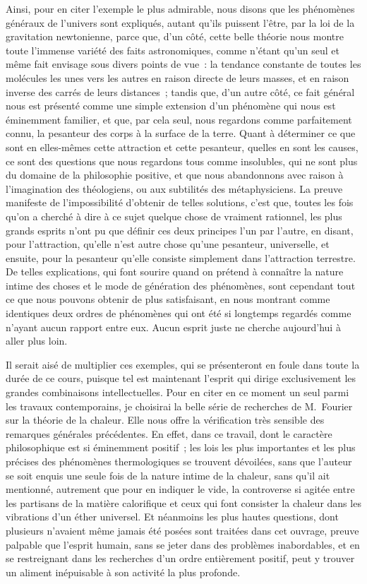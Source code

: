 \documentclass[french,twoside]{book} %
\begin{document}
Ainsi, pour en citer l’exemple le plus admirable, nous disons que les phénomènes généraux de l’univers sont expliqués, autant qu’ils puissent l’être, par la loi de la gravitation newtonienne, parce que, d’un côté, cette belle théorie nous montre toute l’immense variété des faits astronomiques, comme n’étant qu’un seul et même fait envisage sous divers points de vue : la tendance constante de toutes les molécules les unes vers les autres en raison directe de leurs masses, et en raison inverse des carrés de leurs distances ; tandis que, d’un autre côté, ce fait général nous est présenté comme une simple extension d’un phénomène qui nous est éminemment familier, et que, par cela seul, nous regardons comme parfaitement connu, la pesanteur des corps à la surface de la terre. Quant à déterminer ce que sont en elles-mêmes cette attraction et cette pesanteur, quelles en sont les causes, ce sont des questions que nous regardons tous comme insolubles, qui ne sont plus du domaine de la philosophie positive, et que nous abandonnons avec raison à l’imagination des théologiens, ou aux subtilités des métaphysiciens. La preuve manifeste de l’impossibilité d’obtenir de telles solutions, c’est que, toutes les fois qu’on a cherché à dire à ce sujet quelque chose de vraiment rationnel, les plus grands esprits n’ont pu que définir ces deux principes l’un par l’autre, en disant, pour l’attraction, qu’elle n’est autre chose qu’une pesanteur, universelle, et ensuite, pour la pesanteur qu’elle consiste simplement dans l’attraction terrestre. De telles explications, qui font sourire quand on prétend à connaître la nature intime des choses et le mode de génération des phénomènes, sont cependant tout ce que nous pouvons obtenir de plus satisfaisant, en nous montrant comme identiques deux ordres de phénomènes qui ont été si longtemps regardés comme n’ayant aucun rapport entre eux. Aucun esprit juste ne cherche aujourd’hui à aller plus loin.\par
Il serait aisé de multiplier ces exemples, qui se présenteront en foule dans toute la durée de ce cours, puisque tel est maintenant l’esprit qui dirige exclusivement les grandes combinaisons intellectuelles. Pour en citer en ce moment un seul parmi les travaux contemporains, je choisirai la belle série de recherches de M. Fourier sur la théorie de la chaleur. Elle nous offre la vérification très sensible des remarques générales précédentes. En effet, dans ce travail, dont le caractère philosophique est si éminemment positif ; les lois les plus importantes et les plus précises des phénomènes thermologiques se trouvent dévoilées, sans que l’auteur se soit enquis une seule fois de la nature intime de la chaleur, sans qu’il ait mentionné, autrement que pour en indiquer le vide, la controverse si agitée entre les partisans de la matière calorifique et ceux qui font consister la chaleur dans les vibrations d’un éther universel. Et néanmoins les plus hautes questions, dont plusieurs n’avaient même jamais été posées sont traitées dans cet ouvrage, preuve palpable que l’esprit humain, sans se jeter dans des problèmes inabordables, et en se restreignant dans les recherches d’un ordre entièrement positif, peut y trouver un aliment inépuisable à son activité la plus profonde.
\end{document}
